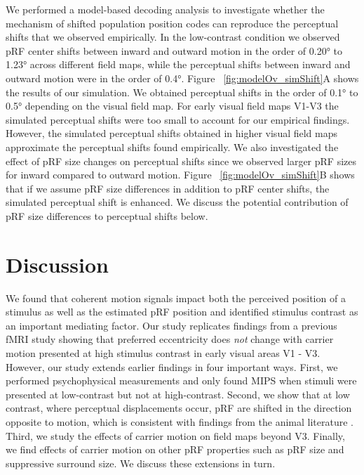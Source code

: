 We performed a model-based decoding analysis to investigate whether the mechanism of shifted population position codes can reproduce the perceptual shifts that we observed empirically. In the low-contrast condition we observed pRF center shifts between inward and outward motion in the order of 0.20° to 1.23° across different field maps, while the perceptual shifts between inward and outward motion were in the order of 0.4°. Figure ~\ref{fig:modelOv_simShift}A shows the results of our simulation. We obtained perceptual shifts in the order of 0.1° to 0.5° depending on the visual field map. For early visual field maps V1-V3 the simulated perceptual shifts were too small to account for our empirical findings. However, the simulated perceptual shifts obtained in higher visual field maps approximate the perceptual shifts found empirically. We also investigated the effect of pRF size changes on perceptual shifts since we observed larger pRF sizes for inward compared to outward motion. Figure ~\ref{fig:modelOv_simShift}B shows that if we assume pRF size differences in addition to pRF center shifts, the simulated perceptual shift is enhanced. We discuss the potential contribution of pRF size differences to perceptual shifts below.

\section{Discussion}
We found that coherent motion signals impact both the perceived position of a stimulus as well as the estimated pRF position and identified stimulus contrast as an important mediating factor. Our study replicates findings from a previous fMRI study showing that preferred eccentricity does \textit{not} change with carrier motion presented at high stimulus contrast in early visual areas V1 - V3. However, our study extends earlier findings in four important ways. First, we performed psychophysical measurements and only found MIPS when stimuli were presented at low-contrast but not at high-contrast. Second, we show that at low contrast, where perceptual displacements occur, pRF are shifted in the direction opposite to motion, which is consistent with findings from the animal literature \parencite{Fu2004}. Third, we study the effects of carrier motion on field maps beyond V3. Finally, we find effects of carrier motion on other pRF properties such as pRF size and suppressive surround size. We discuss these extensions in turn.

